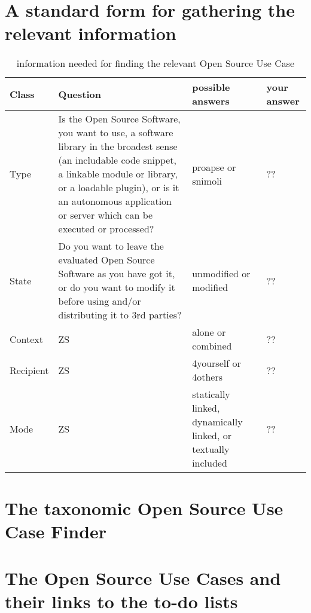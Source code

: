 %
%
%
%
%



\section{A standard form for gathering the relevant information}

\begin{table}
\scriptsize
\caption{information needed for finding the relevant Open Source Use Case}
\begin{center}
\begin{tabular}[h]{|l|l|l|l|}
\hline 
Class & Question & possible answers & your answer\\
\hline 
  Type & 
  Is the Open Source Software, you want to use, a software library in
  the broadest sense (an includable code snippet, a linkable module or library,
  or a loadable plugin), or is it an autonomous application or server
  which can be executed or processed? & 
  proapse or snimoli & ??\\
\hline 
  State & 
  Do you want to leave the evaluated Open Source Software as you have got it, or
  do you want to modify it before using and/or distributing it to 3rd parties? & 
  unmodified or modified & ??\\
\hline 
  Context & 
  ZS & 
  alone or combined & ?? \\
\hline 
Recipient & ZS & 4yourself or 4others & ?? \\
\hline 
Mode & ZS & statically linked, dynamically linked, or textually included & ?? \\
\hline 
\hline
\end{tabular}
\end{center}
\end{table}


\section{The taxonomic Open Source Use Case Finder}

\section{The Open Source Use Cases and their links to the to-do lists}

%
